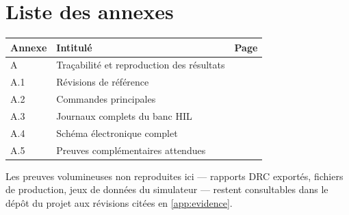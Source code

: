 \chapter*{Liste des annexes}

\begin{longtable}{@{}>{\raggedright\arraybackslash}p{}>{\raggedright\arraybackslash}p{}r@{}}
\toprule
\textbf{Annexe} & \textbf{Intitulé} & \textbf{Page} \\
\midrule
\endhead
A & Traçabilité et reproduction des résultats & \pageref{app:evidence} \\
A.1 & Révisions de référence & \pageref{app:evidence} \\
A.2 & Commandes principales & \pageref{app:evidence} \\
A.3 & Journaux complets du banc HIL & \pageref{lst:hil-r2} \\
A.4 & Schéma électronique complet & \pageref{fig:schematic-annexe} \\
A.5 & Preuves complémentaires attendues & \pageref{app:preuves} \\
\bottomrule
\end{longtable}

\noindent Les preuves volumineuses non reproduites ici --- rapports DRC exportés, fichiers de production, jeux de données du simulateur --- restent consultables dans le dépôt du projet aux révisions citées en \cref{app:evidence}.

\clearpage
